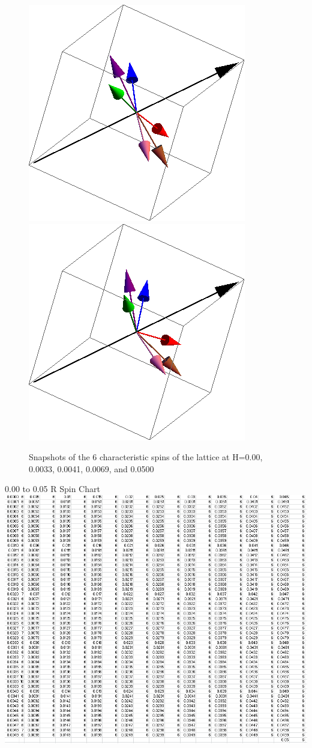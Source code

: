 \documentclass{article}
\begin{document}
\begin{figure}[ht]
\includegraphics[scale=0.3]{111_3000/069S000to005R.png}
\includegraphics[scale=0.3]{111_3000/501S000to005R.png}
\caption{Snapshots of the 6 characteristic spins of the lattice at H=0.00, 0.0033, 0.0041, 0.0069, and 0.0500}
\end{figure}

\pagebreak
\begin{center}
\LARGE 0.00 to 0.05 R Spin Chart
 \includegraphics[keepaspectratio,scale=0.7]{111_3000/000to005RSpinChart.png}
\end{center}
\clearpage
\end{document}
